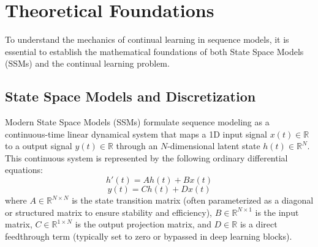 \section{Theoretical Foundations}
\label{sec:theoretical_foundations}

To understand the mechanics of continual learning in sequence models, it is essential to establish the mathematical foundations of both State Space Models (SSMs) and the continual learning problem.

\subsection{State Space Models and Discretization}
Modern State Space Models (SSMs) \cite{guEfficientlyModelingLong2022} formulate sequence modeling as a continuous-time linear dynamical system that maps a 1D input signal $x(t) \in \mathbb{R}$ to a output signal $y(t) \in \mathbb{R}$ through an $N$-dimensional latent state $h(t) \in \mathbb{R}^N$. This continuous system is represented by the following ordinary differential equations:
\begin{equation}
    h'(t) = A h(t) + B x(t)
    \label{eq:ssm_continuous_state}
\end{equation}
\begin{equation}
    y(t) = C h(t) + D x(t)
    \label{eq:ssm_continuous_output}
\end{equation}
where $A \in \mathbb{R}^{N \times N}$ is the state transition matrix (often parameterized as a diagonal or structured matrix to ensure stability and efficiency), $B \in \mathbb{R}^{N \times 1}$ is the input matrix, $C \in \mathbb{R}^{1 \times N}$ is the output projection matrix, and $D \in \mathbb{R}$ is a direct feedthrough term (typically set to zero or bypassed in deep learning blocks).

